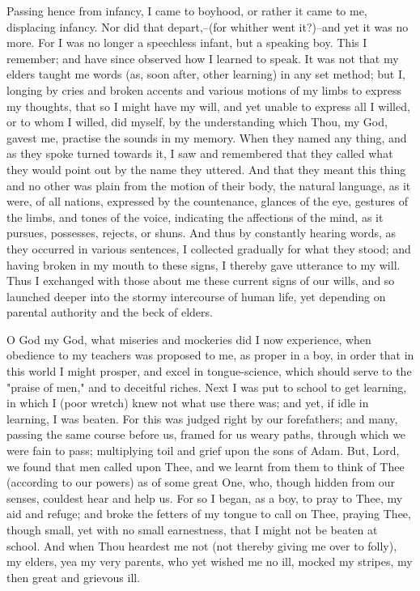 \documentclass[b5paper,openright,12pt,twoside]{book}
\begin{document}
Passing hence from infancy, I came to boyhood, or rather it came to me,
displacing infancy. Nor did that depart,--(for whither went it?)--and
yet it was no more. For I was no longer a speechless infant, but a
speaking boy. This I remember; and have since observed how I learned to
speak. It was not that my elders taught me words (as, soon after, other
learning) in any set method; but I, longing by cries and broken accents
and various motions of my limbs to express my thoughts, that so I might
have my will, and yet unable to express all I willed, or to whom I
willed, did myself, by the understanding which Thou, my God, gavest me,
practise the sounds in my memory. When they named any thing, and as they
spoke turned towards it, I saw and remembered that they called what they
would point out by the name they uttered. And that they meant this
thing and no other was plain from the motion of their body, the natural
language, as it were, of all nations, expressed by the countenance,
glances of the eye, gestures of the limbs, and tones of the voice,
indicating the affections of the mind, as it pursues, possesses,
rejects, or shuns. And thus by constantly hearing words, as they
occurred in various sentences, I collected gradually for what they
stood; and having broken in my mouth to these signs, I thereby gave
utterance to my will. Thus I exchanged with those about me these current
signs of our wills, and so launched deeper into the stormy intercourse
of human life, yet depending on parental authority and the beck of
elders.

O God my God, what miseries and mockeries did I now experience, when
obedience to my teachers was proposed to me, as proper in a boy, in
order that in this world I might prosper, and excel in tongue-science,
which should serve to the "praise of men," and to deceitful riches. Next
I was put to school to get learning, in which I (poor wretch) knew not
what use there was; and yet, if idle in learning, I was beaten. For this
was judged right by our forefathers; and many, passing the same course
before us, framed for us weary paths, through which we were fain to
pass; multiplying toil and grief upon the sons of Adam. But, Lord, we
found that men called upon Thee, and we learnt from them to think of
Thee (according to our powers) as of some great One, who, though hidden
from our senses, couldest hear and help us. For so I began, as a boy, to
pray to Thee, my aid and refuge; and broke the fetters of my tongue to
call on Thee, praying Thee, though small, yet with no small earnestness,
that I might not be beaten at school. And when Thou heardest me not (not
thereby giving me over to folly), my elders, yea my very parents, who
yet wished me no ill, mocked my stripes, my then great and grievous ill.
\end{document}
